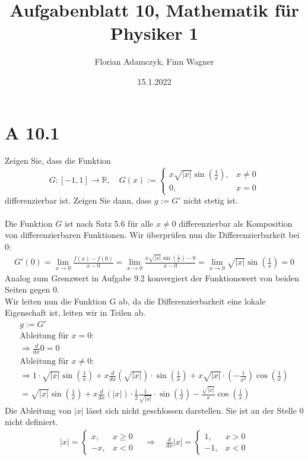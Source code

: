 \documentclass{article}
\date{15.1.2022}
\title{Aufgabenblatt 10, Mathematik für Physiker 1}
\author{Florian Adamczyk, Finn Wagner}
\begin{document}
    \maketitle

    \section*{A 10.1}
    Zeigen Sie, dass die Funktion
    \[G: [-1, 1] \rightarrow \mathbb{R}, \quad G(x) := 
    \begin{cases}
        x \sqrt{|x|} \sin(\frac{1}{x}), &x \neq 0 \\
        0, &x = 0
    \end{cases}\]
    differenzierbar ist. Zeigen Sie dann, dass \(g := G'\) nicht stetig ist. \\ \\
    Die Funktion \(G\) ist nach Satz 5.6 für alle \(x \neq 0\) differenzierbar als Komposition von differenzierbaren Funktionen.
    Wir überprüfen nun die Differenzierbarkeit bei 0:
    \begin{gather*}
        G'(0) = \lim_{x \to 0} \frac{f(x) - f(0)}{x - 0} = \lim_{x \to 0} \frac{ x \sqrt{|x|} \sin(\frac{1}{x}) - 0 }{x - 0} =
        \lim_{x \to 0} \sqrt{|x|} \sin(\frac{1}{x}) = 0
    \end{gather*}
    Analog zum Grenzwert in Aufgabe 9.2 konvergiert der Funktionswert von beiden Seiten gegen 0. \\
    Wir leiten nun die Funktion G ab, da die Differenzierbarkeit eine lokale Eigenschaft ist, leiten wir in Teilen ab.
    \begin{gather*}
        g:= G' \\
        \text{Ableitung für } x = 0: \\
        \Rightarrow \frac{d}{dx} 0 = 0 \\
        \text{Ableitung für } x \neq 0: \\
        \Rightarrow 1 \cdot \sqrt{|x|} \sin(\frac{1}{x}) + x \frac{d}{dx} (\sqrt{|x|}) \cdot \sin(\frac{1}{x}) + x \sqrt{|x|} \cdot \left(-\frac{1}{x^2}\right) \cos(\frac{1}{x}) \\
        = \sqrt{|x|} \sin(\frac{1}{x}) + x \frac{d}{dx} \left(|x|\right) \cdot \frac{1}{2} \frac{1}{\sqrt{|x|}} \cdot \sin(\frac{1}{x}) - \frac{ \sqrt{|x|} }{x} \cos(\frac{1}{x})
    \end{gather*}
    Die Ableitung von \(|x|\) lässt sich nicht geschlossen darstellen. Sie ist an der Stelle 0 nicht definiert.
    \begin{gather*}
        |x| =
        \begin{cases}
            x, & x \geq 0 \\
            -x, & x < 0
        \end{cases} \quad \Rightarrow \quad \frac{d}{dx} |x| =
        \begin{cases}
            1, & x > 0 \\
            -1, & x < 0
        \end{cases}
    \end{gather*}
\end{document}
